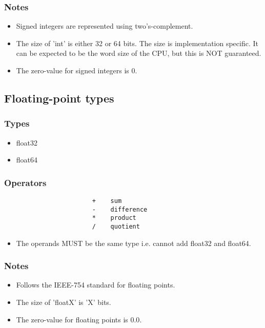 \documentclass{article}
\begin{document}
			\subsubsection{Notes}
				\begin{itemize}
					\item Signed integers are represented using two's-complement. 
					\item The size of 'int' is either 32 or 64 bits. The size is implementation specific. It can be expected to be the word size of the CPU, but this is NOT guaranteed.
					\item The zero-value for signed integers is \colorbox{code}{0}.
				\end{itemize}
				
				
    	\subsection{Floating-point types}
			\subsubsection{Types}
			\begin{itemize}
    				\item float32
    				\item float64
			\end{itemize}
			\subsubsection{Operators}
				\begin{verbatim}
					    +    sum  
					    -    difference   
					    *    product       
					    /    quotient     
				\end{verbatim}	
				\begin{itemize}
					\item The operands MUST be the same type i.e. cannot add float32 and float64.
				\end{itemize}
			\subsubsection{Notes}
				\begin{itemize}
					\item Follows the IEEE-754 standard for floating points. 
					\item The size of 'floatX' is 'X' bits. 
					\item The zero-value for floating points is \colorbox{code}{0.0}.
				\end{itemize}
				
\end{document}
